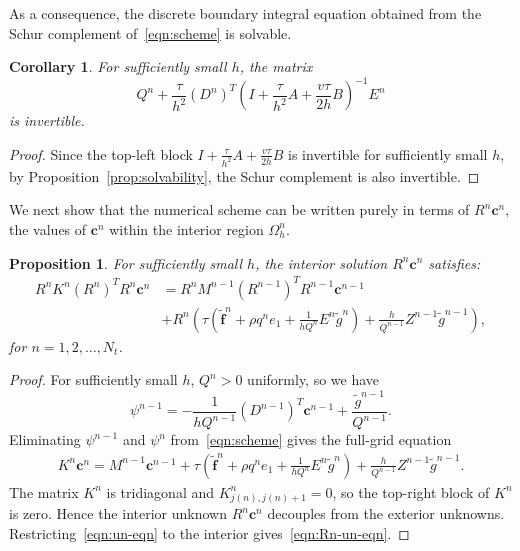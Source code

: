 \documentclass[11pt,reqno]{amsart}
\theoremstyle{plain}
\newtheorem{proposition}[theorem]{Proposition}
\newtheorem{corollary}[theorem]{Corollary}
\theoremstyle{definition}
\numberwithin{equation}{section}
\newcommand{\paren}[1]{\left(#1\right)}
\newcommand{\wt}[1]{\widetilde{#1}}
\newcommand{\bm}[1]{\boldsymbol{#1}}
\begin{document}
As a consequence, the discrete boundary integral equation obtained from the
Schur complement of~\eqref{eqn:scheme} is solvable.
\begin{corollary}\label{cor:schur-inv}
For sufficiently small $h$, the matrix
\begin{equation}
    Q^n + \frac{\tau}{h^2} (D^n)^T\paren{I + \frac{\tau
}{h^2}A+\frac{v\tau}{2h}B}^{-1} E^n
\end{equation}
is invertible.
\end{corollary}
\begin{proof}
Since the top-left block $I+\frac{\tau}{h^2}A + \frac{v\tau}{2h}B$ is invertible for sufficiently small $h$, by Proposition~\ref{prop:solvability}, the Schur complement is also invertible.
\end{proof}

We next show that the numerical scheme can be written purely in terms of $R^n\bm{c}^n$, the values of $\bm{c}^n$ within the interior region $\Omega^n_h$.
\begin{proposition}\label{prop:red-scheme}
For sufficiently small $h$, the interior solution $R^n\bm c^n$ satisfies:
\begin{equation}\label{eqn:Rn-un-eqn}
\begin{aligned}
    R^n K^n (R^n)^T R^n \bm  c^n &=  R^n M^{n-1} (R^{n-1})^T R^{n-1} \bm  c^{n-1} \\
    &+ R^n\paren{ \tau \paren{\wt{\bm f}^n + \rho  q^n e_1 + \frac{1}{h Q^n} E^n \wt g^n} + \frac{h}{Q^{n-1}}  Z^{n-1} \wt g^{n-1} },
\end{aligned}
\end{equation}
for $n=1,2,\dots, N_{t}$.
\end{proposition}
\begin{proof}
For sufficiently small $h$, $Q^n > 0$ uniformly, so we have
\begin{equation}
    \psi^{n-1} = -\frac{1}{h Q^{n-1}} (D^{n-1})^T\bm c^{n-1} + \frac{\wt g^{n-1}}{Q^{n-1}}.
\end{equation}
Eliminating $\psi^{n-1}$ and $\psi^n$ from~\eqref{eqn:scheme} gives the full-grid equation
\begin{align}\label{eqn:un-eqn}
    K^n \bm  c^n  =  M^{n-1}  \bm  c^{n-1} + \tau\paren{\wt{\bm f}^n + \rho  q^n e_1 + \frac{1}{hQ^n} E^n \wt g^n} + \frac{h}{Q^{n-1}}  Z^{n-1} \wt g^{n-1}.
\end{align}
The matrix $K^n$ is tridiagonal and $K^n_{j(n),j(n)+1}=0$, so the top-right block of $K^n$ is zero. Hence the interior unknown $R^n\bm c^n$ decouples from the exterior unknowns. Restricting~\eqref{eqn:un-eqn} to the interior gives~\eqref{eqn:Rn-un-eqn}.
\end{proof}
\end{document}
